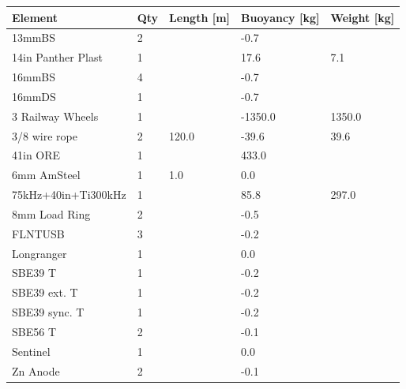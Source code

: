 \documentclass{article}
\begin{document}
\begin{tabularx}{\linewidth}{|l|l|l|l|l|}
\caption{M2: Element summary}\\
\hline
\textbf{Element} & \textbf{Qty} & \textbf{Length [m]} & \textbf{Buoyancy [kg]} & \textbf{Weight [kg]} \\
\hline
13mmBS & 2 &  & -0.7 &  \\ \hline
14in Panther Plast & 1 &  & 17.6 & 7.1 \\ \hline
16mmBS & 4 &  & -0.7 &  \\ \hline
16mmDS & 1 &  & -0.7 &  \\ \hline
3 Railway Wheels & 1 &  & -1350.0 & 1350.0 \\ \hline
3/8 wire rope & 2 & 120.0 & -39.6 & 39.6 \\ \hline
41in ORE & 1 &  & 433.0 &  \\ \hline
6mm AmSteel & 1 & 1.0 & 0.0 &  \\ \hline
75kHz+40in+Ti300kHz & 1 &  & 85.8 & 297.0 \\ \hline
8mm Load Ring & 2 &  & -0.5 &  \\ \hline
FLNTUSB & 3 &  & -0.2 &  \\ \hline
Longranger & 1 &  & 0.0 &  \\ \hline
SBE39 T & 1 &  & -0.2 &  \\ \hline
SBE39 ext. T & 1 &  & -0.2 &  \\ \hline
SBE39 sync. T & 1 &  & -0.2 &  \\ \hline
SBE56 T & 2 &  & -0.1 &  \\ \hline
Sentinel & 1 &  & 0.0 &  \\ \hline
Zn Anode & 2 &  & -0.1 &  \\ \hline
\end{tabularx}
\end{document}
